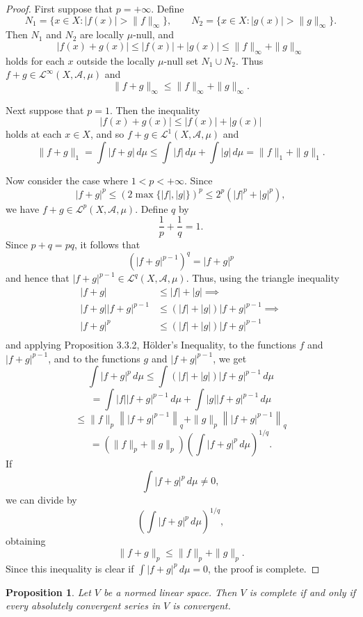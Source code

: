 \documentclass[12pt]{article}
\newtheorem{proposition}{Proposition}
\begin{document}
\begin{proof}
First suppose that $p=+\infty$. Define
\[
N_1=\{x\in X: |f(x)|>\|f\|_\infty\},
\qquad
N_2=\{x\in X: |g(x)|>\|g\|_\infty\}.
\]
Then $N_1$ and $N_2$ are locally $\mu$-null, and
\[
|f(x)+g(x)|
\le |f(x)|+|g(x)|
\le \|f\|_\infty+\|g\|_\infty
\]
holds for each $x$ outside the locally $\mu$-null set $N_1\cup N_2$. Thus
$f+g\in\mathcal{L}^\infty(X,\mathcal{A},\mu)$ and
\[
\|f+g\|_\infty\le \|f\|_\infty+\|g\|_\infty.
\]

Next suppose that $p=1$. Then the inequality
\[
|f(x)+g(x)|\le |f(x)|+|g(x)|
\]
holds at each $x\in X$, and so $f+g\in\mathcal{L}^1(X,\mathcal{A},\mu)$ and
\[
\|f+g\|_1
=
\int |f+g|\,d\mu
\le
\int |f|\,d\mu+\int |g|\,d\mu
=
\|f\|_1+\|g\|_1.
\]

Now consider the case where $1<p<+\infty$. Since
\[
|f+g|^p\le (2\max\{|f|,|g|\})^p\le 2^p(|f|^p+|g|^p),
\]
we have $f+g\in\mathcal{L}^p(X,\mathcal{A},\mu)$. Define $q$ by
\[
\frac1p+\frac1q=1.
\]
Since $p+q=pq$, it follows that
\[
\left(|f+g|^{p-1}\right)^q=|f+g|^p
\]
and hence that $|f+g|^{p-1}\in\mathcal{L}^q(X,\mathcal{A},\mu)$. Thus, using the triangle inequality
\[
\begin{aligned}
    |f+g| &\le |f|+|g| \implies \\
    |f+g||f+g|^{p-1} &\le (|f|+|g|)|f+g|^{p-1} \implies \\
    |f+g|^p &\le (|f|+|g|)|f+g|^{p-1} \\
\end{aligned}
\]
and applying Proposition 3.3.2, Hölder's Inequality, to the functions
$f$ and $|f+g|^{p-1}$, and to the functions $g$ and $|f+g|^{p-1}$, we get
\[
\int |f+g|^p\,d\mu
\le
\int (|f|+|g|)|f+g|^{p-1}\,d\mu
\]
\[
=
\int |f||f+g|^{p-1}\,d\mu
+
\int |g||f+g|^{p-1}\,d\mu
\]
\[
\le
\|f\|_p\left\||f+g|^{p-1}\right\|_q
+
\|g\|_p\left\||f+g|^{p-1}\right\|_q
\]
\[
=
(\|f\|_p+\|g\|_p)
\left(\int |f+g|^p\,d\mu\right)^{1/q}.
\]
If
\[
\int |f+g|^p\,d\mu\neq 0,
\]
we can divide by
\[
\left(\int |f+g|^p\,d\mu\right)^{1/q},
\]
obtaining
\[
\|f+g\|_p\le \|f\|_p+\|g\|_p.
\]
Since this inequality is clear if $\int |f+g|^p\,d\mu=0$, the proof is complete.
\end{proof}

\begin{proposition}
Let \(V\) be a normed linear space. Then \(V\) is complete if and only if
every absolutely convergent series in \(V\) is convergent.
\end{proposition}
\end{document}
